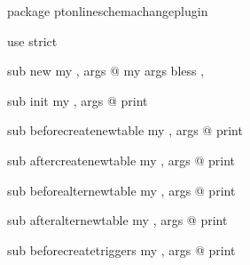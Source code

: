 \documentclass[letterpaper,10pt,english]{sphinxmanual}
\begin{document}
\begin{sphinxVerbatim}[commandchars=\\\{\}]
 package pt\PYGZus{}online\PYGZus{}schema\PYGZus{}change\PYGZus{}plugin

 use strict

 sub new 
    my , \PYGZpc{}args  @\PYGZus{}
    my    \PYGZpc{}args 
     bless , 

 sub init 
    my , \PYGZpc{}args  @\PYGZus{}
    print 

 sub before\PYGZus{}create\PYGZus{}new\PYGZus{}table 
    my , \PYGZpc{}args  @\PYGZus{}
    print 

 sub after\PYGZus{}create\PYGZus{}new\PYGZus{}table 
    my , \PYGZpc{}args  @\PYGZus{}
    print 

 sub before\PYGZus{}alter\PYGZus{}new\PYGZus{}table 
    my , \PYGZpc{}args  @\PYGZus{}
    print 

 sub after\PYGZus{}alter\PYGZus{}new\PYGZus{}table 
    my , \PYGZpc{}args  @\PYGZus{}
    print 

 sub before\PYGZus{}create\PYGZus{}triggers 
    my , \PYGZpc{}args  @\PYGZus{}
    print 


\end{sphinxVerbatim}
\end{document}
